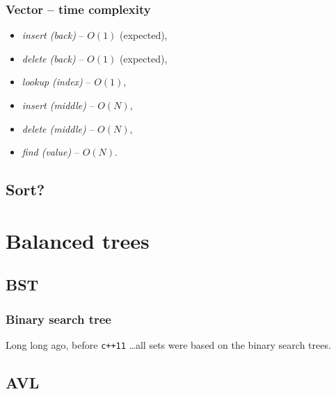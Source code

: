 \documentclass{beamer}
\begin{document}
\begin{frame}
    \frametitle{Vector -- time complexity}
    \begin{itemize}
        \item \textit{insert (back)} \pause -- $O(1)$ (expected), \pause
        \item \textit{delete (back)} \pause -- $O(1)$ (expected), \pause
        \item \textit{lookup (index)} \pause -- $O(1)$, \pause
        \item \textit{insert (middle)} -- $O(N)$,
        \item \textit{delete (middle)} -- $O(N)$,
        \item \textit{find (value)} -- $O(N)$.
    \end{itemize}
\end{frame}

\subsection{Sort?}

\section{Balanced trees}

\subsection{BST}

\begin{frame}
    \frametitle{Binary search tree}
    Long long ago, before \texttt{c++11} \dots \pause all sets were based
    on the binary search trees.

    \centering
\end{frame}

\subsection{AVL}
\end{document}
